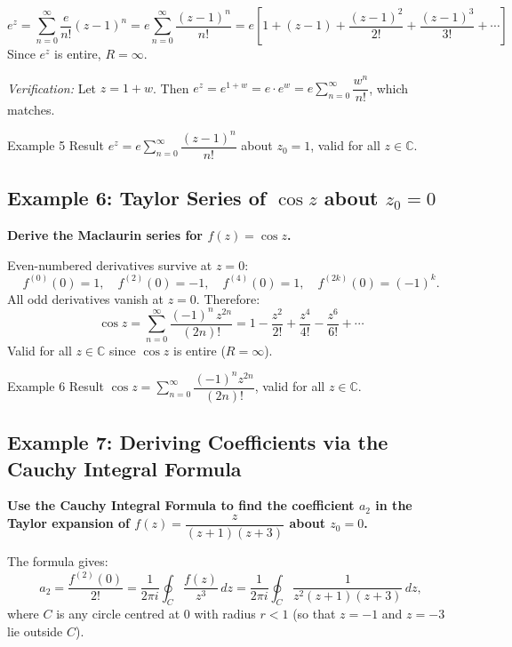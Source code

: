 \documentclass[12pt,a4paper]{article}
\begin{document}
\[
  e^z = \sum_{n=0}^{\infty} \frac{e}{n!}(z-1)^n = e\sum_{n=0}^{\infty}\frac{(z-1)^n}{n!}
      = e\left[1 + (z-1) + \frac{(z-1)^2}{2!} + \frac{(z-1)^3}{3!} + \cdots\right]
\]
Since $e^z$ is entire, $R = \infty$.

\textit{Verification:} Let $z = 1 + w$. Then $e^z = e^{1+w} = e \cdot e^w = e\sum_{n=0}^{\infty}\dfrac{w^n}{n!}$, which matches. \checkmark

\begin{learnbox}{Example 5 Result}
$e^z = e\displaystyle\sum_{n=0}^{\infty}\dfrac{(z-1)^n}{n!}$ about $z_0=1$, valid for all $z\in\mathbb{C}$.
\end{learnbox}

\subsection*{Example 6: Taylor Series of $\cos z$ about $z_0 = 0$}

\textbf{Derive the Maclaurin series for $f(z) = \cos z$.}

\medskip
Even-numbered derivatives survive at $z=0$:
\[
  f^{(0)}(0)=1,\quad f^{(2)}(0)=-1,\quad f^{(4)}(0)=1,\quad f^{(2k)}(0)=(-1)^k.
\]
All odd derivatives vanish at $z=0$. Therefore:
\[
  \cos z = \sum_{n=0}^{\infty} \frac{(-1)^n\,z^{2n}}{(2n)!}
         = 1 - \frac{z^2}{2!} + \frac{z^4}{4!} - \frac{z^6}{6!} + \cdots
\]
Valid for all $z \in \mathbb{C}$ since $\cos z$ is entire ($R = \infty$).

\begin{learnbox}{Example 6 Result}
$\cos z = \displaystyle\sum_{n=0}^{\infty}\dfrac{(-1)^n z^{2n}}{(2n)!}$, valid for all $z \in \mathbb{C}$.
\end{learnbox}

\subsection*{Example 7: Deriving Coefficients via the Cauchy Integral Formula}

\textbf{Use the Cauchy Integral Formula to find the coefficient $a_2$ in the Taylor expansion of $f(z) = \dfrac{z}{(z+1)(z+3)}$ about $z_0 = 0$.}

\medskip
The formula gives:
\[
  a_2 = \frac{f^{(2)}(0)}{2!} = \frac{1}{2\pi i}\oint_{C}\frac{f(z)}{z^{3}}\,dz
      = \frac{1}{2\pi i}\oint_{C}\frac{1}{z^2(z+1)(z+3)}\,dz,
\]
where $C$ is any circle centred at $0$ with radius $r < 1$ (so that $z=-1$ and $z=-3$ lie outside $C$).
\end{document}
